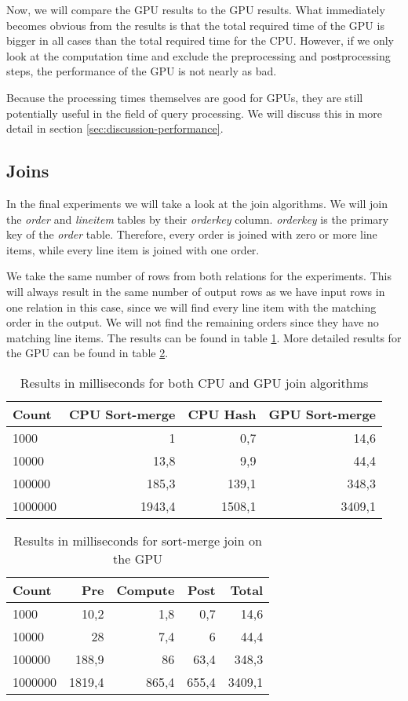 \documentclass[a4paper,titlepage]{article}
\begin{document}
Now, we will compare the GPU results to the GPU results. What immediately becomes obvious from the results is that the total required time of the GPU is bigger in all cases than the total required time for the CPU. However, if we only look at the computation time and exclude the preprocessing and postprocessing steps, the performance of the GPU is not nearly as bad.

Because the processing times themselves are good for GPUs, they are still potentially useful in the field of query processing. We will discuss this in more detail in section \ref{sec:discussion-performance}.

\subsection{Joins}
In the final experiments we will take a look at the join algorithms. We will join the \emph{order} and \emph{lineitem} tables by their \emph{orderkey} column. \emph{orderkey} is the primary key of the \emph{order} table. Therefore, every order is joined with zero or more line items, while every line item is joined with one order.

We take the same number of rows from both relations for the experiments. This will always result in the same number of output rows as we have input rows in one relation in this case, since we will find every line item with the matching order in the output. We will not find the remaining orders since they have no matching line items. The results can be found in table \ref{tbl:join-results}. More detailed results for the GPU can be found in table \ref{tbl:join-gpu}.

\begin{table}
\begin{tabular}{l r r r}
\toprule
\textbf{Count} & \textbf{CPU Sort-merge} & \textbf{CPU Hash} & \textbf{GPU Sort-merge} \\
\midrule
1000    & 1      & 0,7    & 14,6 \\
10000   & 13,8   & 9,9    & 44,4 \\
100000  & 185,3  & 139,1  & 348,3 \\
1000000 & 1943,4 & 1508,1 & 3409,1 \\
\bottomrule
\end{tabular}
\label{tbl:join-results}
\caption{Results in milliseconds for both CPU and GPU join algorithms}
\end{table}

\begin{table}
\begin{tabular}{l r r r r}
\toprule
\textbf{Count} & \textbf{Pre} & \textbf{Compute} & \textbf{Post} & \textbf{Total}\\
\midrule
1000    & 10,2   & 1,8   & 0,7   & 14,6 \\
10000   & 28     & 7,4   & 6     & 44,4 \\
100000  & 188,9  & 86    & 63,4  & 348,3 \\
1000000 & 1819,4 & 865,4 & 655,4 & 3409,1 \\
\bottomrule
\end{tabular}
\label{tbl:join-gpu}
\caption{Results in milliseconds for sort-merge join on the GPU}
\end{table}
\end{document}
